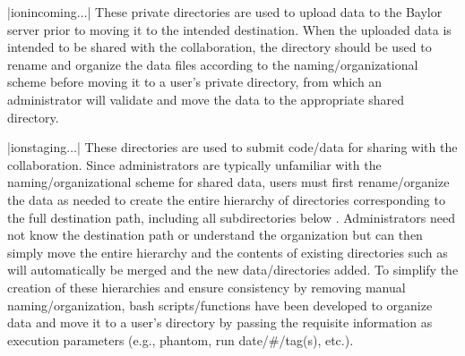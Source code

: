 \begin{tcbenvironment}
\begin{tcbparbox}
\end{tcbparbox}
\begin{tcbparbox}|\dirsep ion\dirsep incoming\dirsep{}\dirsep$\dots$|
\bfdash These private directories are used to upload data to the Baylor server prior to moving it to the intended destination.  When the uploaded data is intended to be shared with the collaboration, the directory should be used to rename and organize the data files according to the naming/organizational scheme before moving it to a user's private  directory, from which an administrator will validate and move the data to the appropriate shared directory.
\end{tcbparbox}
\begin{tcbparbox}|\dirsep ion\dirsep staging\dirsep{}\dirsep$\dots$|
\bfdash These directories are used to submit code/data for sharing with the collaboration.  Since administrators are typically unfamiliar with the naming/organizational scheme for shared data, users must first rename/organize the data as needed to create the entire hierarchy of directories corresponding to the full destination path, including all subdirectories below .  Administrators need not know the destination path or understand the organization but can then simply move the entire hierarchy and the contents of existing directories such as  will automatically be merged and the new data/directories added.  To simplify the creation of these hierarchies and ensure consistency by removing manual naming/organization, bash scripts/functions have been developed to organize data and move it to a user's  directory by passing the requisite information as execution parameters (e.g., phantom, run date/\#/tag(s), etc.).

\end{tcbparbox}
\end{tcbenvironment}
